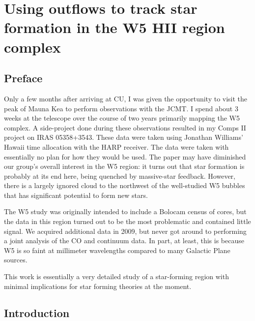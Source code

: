 
\chapter{Using outflows to track star formation in the W5 HII region complex}
\label{ch:w5}
\section{Preface}
Only a few months after arriving at CU, I was given the opportunity to visit
the peak of Mauna Kea to perform observations with the JCMT.  I spend about 3
weeks at the telescope over the course of two years primarily mapping the W5
complex.  A side-project done during these observations resulted in my Comps II
project on IRAS 05358+3543.  These data were taken using Jonathan Williams'
Hawaii time allocation with the HARP receiver.  The data were taken with
essentially no plan for how they would be used.  The paper may have diminished
our group's overall interest in the W5 region: it turns out that star formation
is probably at its end here, being quenched by massive-star feedback.  However,
there is a largely ignored cloud to the northwest of the well-studied W5 bubbles
that has significant potential to form new stars.  

The W5 study was originally intended to include a Bolocam census of cores, but
the data in this region turned out to be the most problematic and contained
little signal.  We acquired additional data in 2009, but never got around to
performing a joint analysis of the CO and continuum data.  In part, at least,
this is because W5 is so faint at millimeter wavelengths compared to many
Galactic Plane sources.

This work is essentially a very detailed study of a star-forming region with
minimal implications for star forming theories at the moment.

\section{Introduction}


